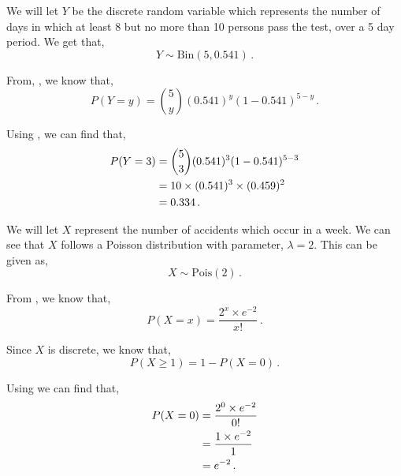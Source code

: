 \begin{subquestions}
\begin{subsubquestions}

\subsubquestion

We will let $Y$ be the discrete random variable which represents the number of days in which at least 8 but no more than 10 persons pass the test, over a 5 day period. We get that,
\begin{equation}
	Y \sim \text{Bin}(5,0.541) \,.
\end{equation}

From, , we know that,
\begin{equation}
	P(Y = y) = { 5 \choose y} (0.541)^y (1-0.541)^{5-y} \,. \label{2009:q4:BinEqn2}
\end{equation}

Using , we can find that,
\begin{align}
	P(Y=3) & = { 5 \choose 3} (0.541)^3 (1-0.541)^{5-3} \nonumber \\
	       & = 10 \times (0.541)^3 \times (0.459)^{2} \nonumber \\
	       & = 0.334 \,.
\end{align}

\end{subsubquestions}

	
\subquestion

We will let $X$ represent the number of accidents which occur in a week. We can see that $X$ follows a Poisson distribution with parameter, $\lambda =2$. This can be given as,
\begin{equation}
	X \sim \text{Pois}(2) \,.
\end{equation}

From , we know that,
\begin{equation}
	P(X = x) =\frac{2^x \times e^{-2}}{x!} \,. \label{2009:q4:PoisEqn1}
\end{equation}

Since $X$ is discrete, we know that,
\begin{equation}
	P(X \geq 1) = 1 - P(X=0) \,. \label{2009:q4:PoisEqn2}
\end{equation}

Using  we can find that,
\begin{align}
	P(X=0) & = \frac{2^0 \times e^{-2}}{0!} \nonumber \\
	     & = \frac{1 \times e^{-2}}{1} \nonumber \\
	     & = e^{-2} \,. 
\end{align}


\end{subquestions}
